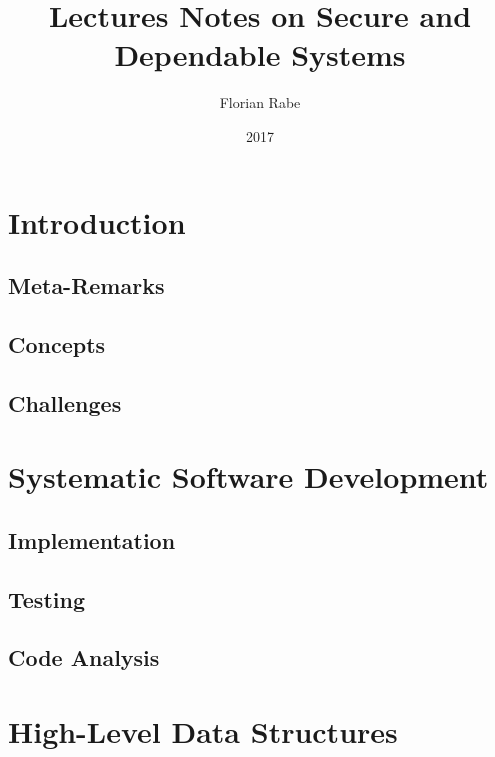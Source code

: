 \documentclass{book}
\title{Lectures Notes on Secure and Dependable Systems}
\author{Florian Rabe}
\date{2017}
\begin{document}
\maketitle

\tableofcontents
\newpage

\part{Introduction}

 \chapter{Meta-Remarks}
  

  \chapter{Concepts}
   

 \chapter{Challenges}
   

\part{Systematic Software Development}

  \chapter{Implementation}
    

  \chapter{Testing}
    

  \chapter{Code Analysis}
    
    

\part{High-Level Data Structures}
\end{document}
